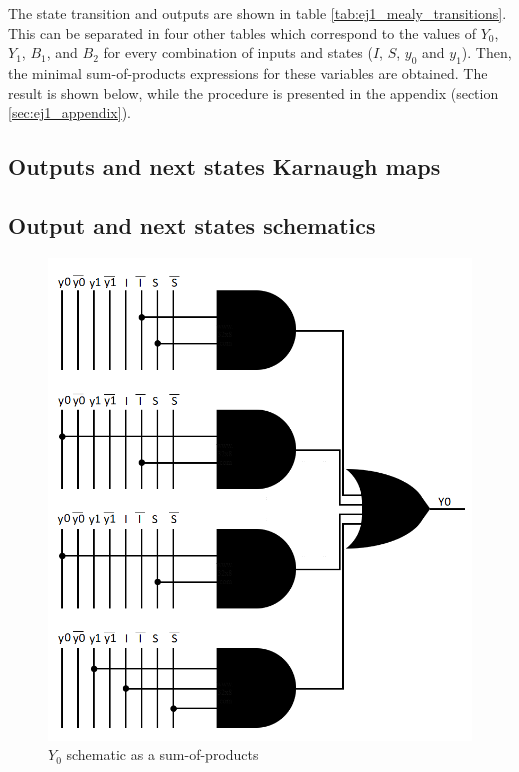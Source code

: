 \documentclass[../../e3_tp3_main.tex]{subfiles}
\begin{document}
The state transition and outputs are shown in table \ref{tab:ej1_mealy_transitions}. This can be separated in four other tables which correspond to the values of $Y_0$, $Y_1$, $B_1$, and $B_2$ for every combination of inputs and states ($I$, $S$, $y_0$ and $y_1$). Then, the minimal sum-of-products expressions for these variables are obtained. The result is shown below, while the procedure is presented in the appendix (section \ref{sec:ej1_appendix}). 

\subsection{Outputs and next states Karnaugh maps}

\subsection{Output and next states schematics}
\begin{figure}[H]
	\centering
	\includegraphics{figures/mealy_Y0_schem.PNG}
	\caption{$Y_0$ schematic as a sum-of-products}
	\label{fig:ej1_mealy_Y0_schem}
\end{figure}
\end{document}

